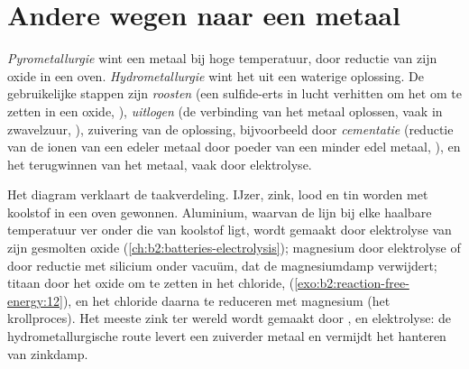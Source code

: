 \section{Andere wegen naar een metaal}

\begin{definition}\label{def:b2:ellingham:metallurgy}
\emph{Pyrometallurgie} wint een metaal bij hoge
temperatuur, door reductie van zijn oxide in een oven. \emph{Hydrometallurgie}
wint het uit een waterige oplossing. De gebruikelijke stappen zijn
\emph{roosten} (een sulfide-erts in lucht verhitten om het om te zetten in
een oxide, ), \emph{uitlogen}
(de verbinding van het metaal oplossen, vaak in zwavelzuur, ), zuivering van de oplossing, bijvoorbeeld door
\emph{cementatie} (reductie van de ionen van een edeler metaal
door poeder van een minder edel metaal, ), en het
terugwinnen van het metaal, vaak door elektrolyse.
\end{definition}

Het diagram verklaart de taakverdeling. IJzer, zink, lood en tin worden met
koolstof in een oven gewonnen. Aluminium, waarvan de lijn bij elke haalbare
temperatuur ver onder die van koolstof ligt, wordt gemaakt door elektrolyse van zijn gesmolten oxide
(\cref{ch:b2:batteries-electrolysis}); magnesium door elektrolyse of door
reductie met silicium onder vacuüm, dat de magnesiumdamp verwijdert;
titaan door het oxide om te zetten in het chloride,  (\cref{exo:b2:reaction-free-energy:12}), en het chloride daarna te reduceren met
magnesium (het krollproces). Het meeste zink ter wereld wordt gemaakt door ,
 en elektrolyse: de hydrometallurgische route levert een zuiverder metaal en
vermijdt het hanteren van zinkdamp.

